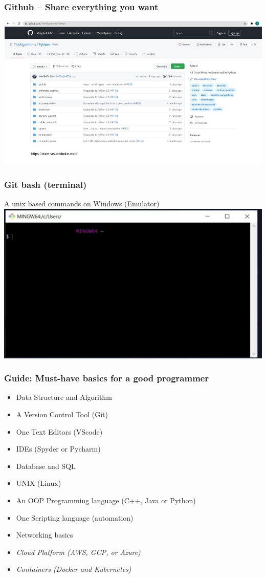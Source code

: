 \documentclass{beamer}
\begin{document}
\begin{frame}
    \frametitle{Github – Share everything you want}
    \centering
    \includegraphics[scale = 0.5]{figures/github.jpg}
\end{frame}

\begin{frame}
    \frametitle{Git bash (terminal)}
    A unix based commands on Windows (Emulator)
    \centering
    \includegraphics[scale = 0.5]{figures/git_bash.jpg}
\end{frame}

\begin{frame}
    \frametitle{Guide: Must-have basics for a good programmer}
    \begin{itemize}
        \item Data Structure and Algorithm
        \item A Version Control Tool (Git)
        \item One Text Editors (VScode)
        \item IDEs (Spyder or Pycharm)
        \item Database and SQL
        \item UNIX (Linux)
        \item An OOP Programming language (C++, Java or Python)
        \item One Scripting language (automation)
        \item Networking basics
        \item \textit{Cloud Platform (AWS, GCP, or Azure)}
        \item \textit{Containers (Docker and Kubernetes)}
    \end{itemize}
\end{frame}
\end{document}
